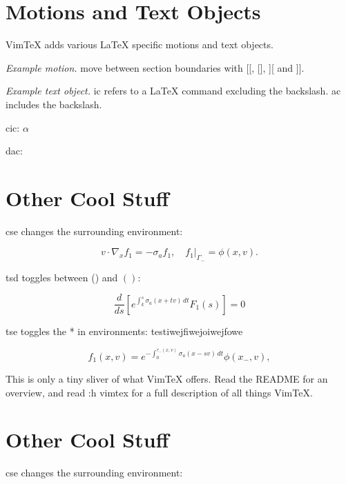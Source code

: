 \documentclass{article}
\begin{document}
\section{Motions and Text Objects}

VimTeX adds various LaTeX specific motions and text objects.

\emph{Example motion.} move between section boundaries with [[, [], ][ and ]].

\emph{Example text object.} ic refers to a LaTeX command excluding the
backslash. ac includes the backslash.

cic: \( \alpha \)

dac: \(  \)











\section{Other Cool Stuff}

cse changes the surrounding environment:

\begin{equation}
  v \cdot \nabla_x f_1 = -\sigma_a f_1, \quad f_1 \rvert_{\Gamma_-} = \phi(x,v).
\end{equation}

tsd toggles between () and \( \left( \right) \):

\begin{equation*}
  \frac{d}{ds} \left[ e^{\int_k^s \sigma_a(x + tv)\,dt} F_1(s) \right] = 0
\end{equation*}

tse toggles the * in environments:
testiwejfiwejoiwejfowe

\begin{equation}
  f_1(x, v) = e^{-\int_0^{\tau_-(x, v)} \sigma_a(x - sv)\,dt} \phi(x_-, v),
\end{equation}

This is only a tiny sliver of what VimTeX offers.
Read the README for an overview, and read :h vimtex for a full description of
all things VimTeX.




\section{Other Cool Stuff}

cse changes the surrounding environment:
\end{document}
